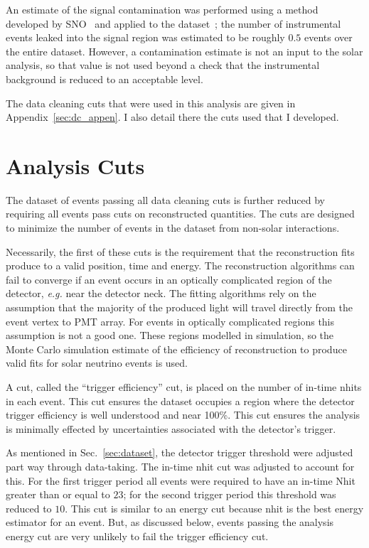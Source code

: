 An estimate of the signal contamination was performed using a method developed
by SNO~\citep{neil_thesis} and applied to the dataset~\citep{dc_document};
the number of instrumental events leaked into the signal region was estimated
to be roughly $0.5$ events over the entire dataset.
However, a contamination estimate is not an input to the solar analysis,
so that value is not used beyond a check that the instrumental background
is reduced to an acceptable level.

The data cleaning cuts that were used in this analysis are given in Appendix~\ref{sec:dc_appen}.
I also detail there the cuts used that I developed.


\section{Analysis Cuts}
\label{sec:analysis_cuts}
The dataset of events passing all data cleaning cuts is further reduced by
requiring all events pass cuts on reconstructed quantities.
The cuts are designed to minimize the number of events in the dataset from
non-solar interactions.

Necessarily, the first of these cuts is the requirement that the reconstruction
fits produce to a valid position, time and energy.
The reconstruction algorithms can fail to converge if an event occurs in an
optically complicated region of the detector, \textit{e.g.} near the detector
neck. The fitting algorithms rely on the assumption that the majority of
the produced light will travel directly from the event vertex to PMT array.
For events in optically complicated regions this assumption is not a good one.
These regions modelled in simulation, so the Monte Carlo simulation estimate of
the efficiency of reconstruction to produce valid fits for solar neutrino events
is used.

A cut, called the ``trigger efficiency'' cut,  is placed on the number of
in-time nhits in each event.
This cut ensures the dataset occupies a region where the detector trigger
efficiency is well understood and near 100\%.
This cut ensures the analysis is minimally effected by uncertainties
associated with the detector's trigger.

As mentioned in Sec.~\ref{sec:dataset}, the detector trigger threshold were adjusted
part way through data-taking. The in-time nhit cut was adjusted to
account for this.
For the first trigger period all events were required to have an in-time
Nhit greater than or equal to $23$; for the second trigger period this
threshold was reduced to $10$.
This cut is similar to an energy cut because nhit is the best energy estimator
for an event. But, as discussed below, events passing the analysis energy cut
are very unlikely to fail the trigger efficiency cut.

